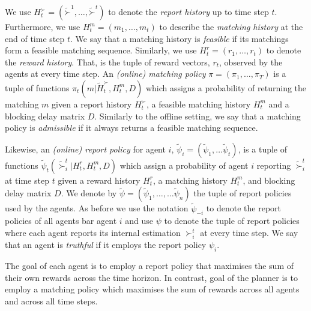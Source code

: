 \documentclass[letterpaper,11pt]{article}
\begin{document}
We use $H^{\mathord{\succ}}_{t} = (\tilde{\mathord{\succ}}^{1}, \dots, \tilde{\mathord{\succ}}^{t})$ to denote the \emph{report history} up to time step $t$.
Furthermore, we use $H^{m}_{t} = (m_{1}, \dots, m_{t})$ to describe the \emph{matching history} at the end of time step $t$. We say that a matching history is \emph{feasible} if its matchings form a feasible matching sequence. Similarly, we use $H_{t}^{r} =(r_{1}, \dots, r_{t})$ to denote the \emph{reward history}. That, is the tuple of reward vectors, $r_{t}$, observed by the agents at every time step. An \emph{(online) matching policy} $\pi = (\pi_{1}, \dots, \pi_{T})$ is a tuple of functions $\pi_{t}(m | \tilde{H}^{\succ}_{t}, H^{m}_{t}, D)$ which assigns a probability of returning the matching $m$ given a report history $H^{\succ}_{t}$, a feasible matching history $H^{m}_{t}$ and a blocking delay matrix $D$. Similarly to the offline setting, we say that a matching policy is \emph{admissible} if it always returns a feasible matching sequence. 

Likewise, an \emph{(online) report policy} for agent $i$, $\tilde{\psi}_{i} = (\tilde{\psi}_{1}, \dots \tilde{\psi}_{t})$, is a tuple of functions $\tilde{\psi}_{t}(\tilde{\succ}_{i}^{t} | H^{r}_{t}, H^{m}_{t}, D)$ which assign a probability of agent $i$ reporting $\tilde{\succ}_{i}^{t}$ at time step $t$ given a reward history $H^{r}_{t}$, a matching history $H^{m}_{t}$, and blocking delay matrix $D$. We denote by $\tilde{\psi} = (\tilde{\psi}_{1}, \dots, \dots \tilde{\psi}_{n})$ the tuple of report policies used by the agents.  As before we use the notation $\tilde{\psi}_{-i}$ to denote the report policies of all agents bar agent $i$ and use $\psi$ to denote the tuple of report policies where each agent reports its internal estimation $\succ^{t}_{i}$ at every time step. We say that an agent is \emph{truthful} if it employs the report policy $\psi_{i}$.

The goal of each agent is to employ a report policy that maximises the sum of their own rewards across the time horizon. In contrast, goal of the planner is to employ a matching policy which maximises the sum of rewards across all agents and across all time steps. 
\end{document}
